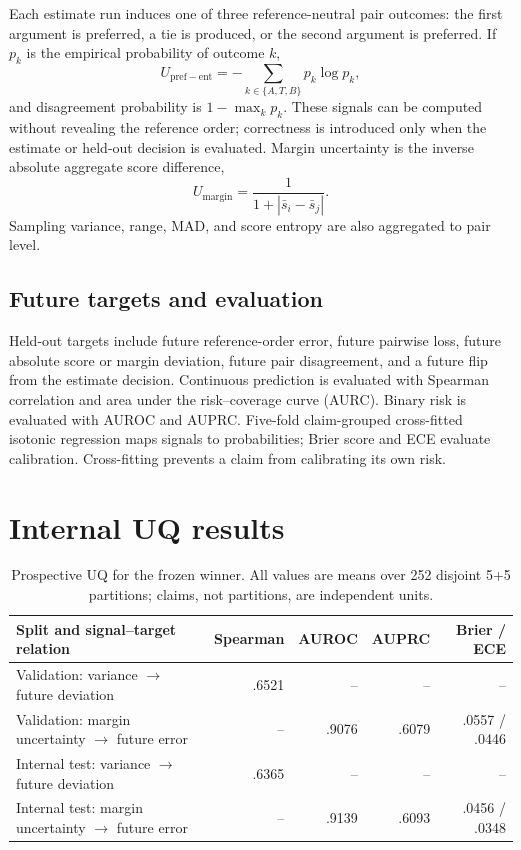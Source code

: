 \documentclass[11pt,twoside,a4paper]{report}
\begin{document}
Each estimate run induces one of three reference-neutral pair outcomes: the first
argument is preferred, a tie is produced, or the second argument is preferred.  If
$p_k$ is the empirical probability of outcome $k$,
\begin{equation}
  U_{\mathrm{pref-ent}}=-\sum_{k\in\{A,T,B\}}p_k\log p_k,
\end{equation}
and disagreement probability is $1-\max_k p_k$.  These signals can be computed
without revealing the reference order; correctness is introduced only when the
estimate or held-out decision is evaluated.  Margin uncertainty is the inverse
absolute aggregate score difference,
\begin{equation}
  U_{\mathrm{margin}}=\frac{1}{1+|\bar s_i-\bar s_j|}.
  \label{eq:margin-uq}
\end{equation}
Sampling variance, range, MAD, and score entropy are also aggregated to pair level.

\subsection{Future targets and evaluation}

Held-out targets include future reference-order error, future pairwise loss, future
absolute score or margin deviation, future pair disagreement, and a future flip from
the estimate decision.  Continuous prediction is evaluated with Spearman correlation
and area under the risk--coverage curve (AURC).  Binary risk is evaluated with AUROC
and AUPRC.  Five-fold claim-grouped cross-fitted isotonic regression maps signals to
probabilities; Brier score and ECE evaluate calibration.  Cross-fitting prevents a
claim from calibrating its own risk.

\section{Internal UQ results}

\begin{table}[htbp]
\centering
\caption{Prospective UQ for the frozen winner.  All values are means over 252
disjoint 5+5 partitions; claims, not partitions, are independent units.}
\label{tab:uq-internal}
\begin{tabularx}{\textwidth}{Yrrrr}
\toprule
Split and signal--target relation & Spearman & AUROC & AUPRC & Brier / ECE \\
\midrule
Validation: variance $\rightarrow$ future deviation & .6521 & -- & -- & -- \\
Validation: margin uncertainty $\rightarrow$ future error & -- & .9076 & .6079 & .0557 / .0446 \\
Internal test: variance $\rightarrow$ future deviation & .6365 & -- & -- & -- \\
Internal test: margin uncertainty $\rightarrow$ future error & -- & .9139 & .6093 & .0456 / .0348 \\
\bottomrule
\end{tabularx}
\end{table}
\end{document}
